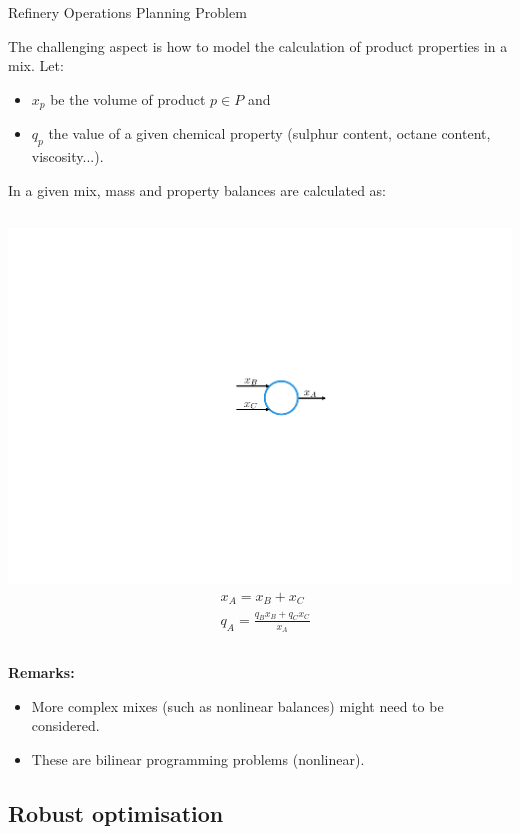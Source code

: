 \begin{frame}{Refinery Operations Planning Problem}

	The challenging aspect is how to model the calculation of product properties in a \alert{mix}. Let:
	
	\begin{itemize}
		\item $x_p$ be the volume of product $p \in P$ and
		\item $q_p$ the value of a given chemical property (sulphur content, octane content, viscosity...).
	\end{itemize}
	In a given mix, mass and property balances are calculated as:
	
	\begin{columns}
		\centering
		\includegraphics[scale=0.6]{Figures/Mixer.pdf}
		\begin{align*}
		& x_A = x_B + x_C \\ 
		& q_A = \frac{q_Bx_B + q_Cx_C}{x_A}  
		\end{align*}
	\end{columns}
	\pause
	{\bf Remarks:}
	\vspace{-6pt} 
	\begin{itemize}
		\item More complex mixes (such as nonlinear balances) might need to be considered.
		\item These are \alert{bilinear programming} problems (nonlinear).
	\end{itemize}
\end{frame}


\subsection{Robust optimisation}


